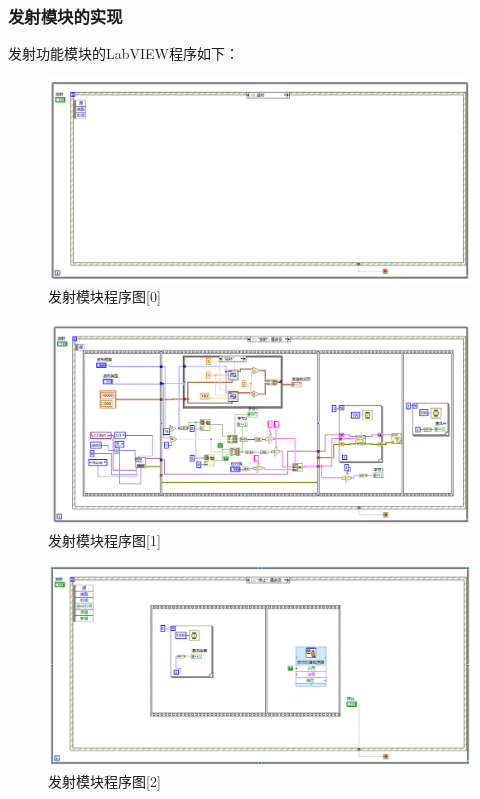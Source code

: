 \documentclass[UTF8]{article}
\begin{document}
\subsubsection{发射模块的实现}
发射功能模块的LabVIEW程序如下：
\begin{figure}[H]
    \centering %
    \includegraphics[width=1\textwidth]{figure/发射模块-程序0.png} 
    \caption{发射模块程序图[0]} %
\end{figure}
\begin{figure}[H]
    \centering %
    \includegraphics[width=1\textwidth]{figure/发射模块-程序1.png} 
    \caption{发射模块程序图[1]} %
\end{figure}
\begin{figure}[H]
    \centering %
    \includegraphics[width=1\textwidth]{figure/发射模块-程序2.png} 
    \caption{发射模块程序图[2]} %
\end{figure}
\end{document}
